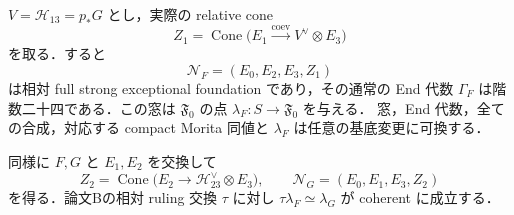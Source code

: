 \begin{proposition}[全基底上のnormal候補窓]
\label{prop:qa-relative-avatar-normal-window}
$V=\mathcal H_{13}=p_*G$ とし，実際の relative cone
\[
 Z_1=\operatorname{Cone}
  \bigl(E_1\xrightarrow{\mathrm{coev}}V^\vee\otimes E_3\bigr)
\]
を取る．すると
\[
 \mathcal N_F=(E_0,E_2,E_3,Z_1)
\]
は相対 full strong exceptional foundation であり，その通常の End
代数 $\Gamma_F$ は階数二十四である．この窓は
$\mathfrak F_0$ の点 $\lambda_F:S\to\mathfrak F_0$ を与える．
窓，End 代数，全ての合成，対応する compact Morita 同値と
$\lambda_F$ は任意の基底変更に可換する．

同様に $F,G$ と $E_1,E_2$ を交換して
\[
 Z_2=\operatorname{Cone}
 \bigl(E_2\to\mathcal H_{23}^\vee\otimes E_3\bigr),\qquad
 \mathcal N_G=(E_0,E_1,E_3,Z_2)
\]
を得る．論文Bの相対 ruling 交換 $\tau$ に対し
$\tau\lambda_F\simeq\lambda_G$ が coherent に成立する．
\end{proposition}
